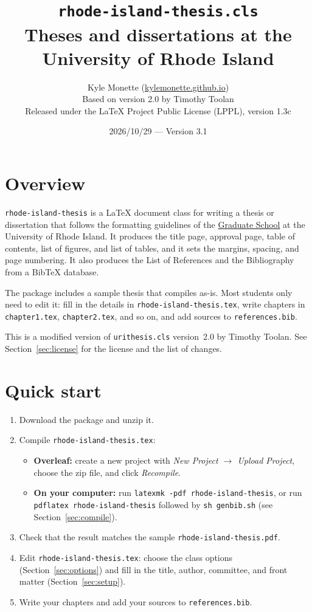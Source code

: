 \documentclass[11pt]{article}
\title{\texttt{rhode-island-thesis.cls}\\[0.5ex]
  \large Theses and dissertations at the University of Rhode Island}
\author{Kyle Monette (\href{https://kylemonette.github.io}{kylemonette.github.io}) \\
  \small Based on version 2.0 by Timothy Toolan \\
  \small Released under the LaTeX Project Public License (LPPL), version 1.3c}
\date{2026/10/29 --- Version 3.1}
\newcommand\cls{\texttt{rhode-island-thesis}}
\newcommand\file[1]{\texttt{#1}}
\begin{document}
\maketitle

\section*{Overview}

\cls{} is a \LaTeX{} document class for writing a thesis or dissertation that
follows the formatting guidelines of the
\href{https://web.uri.edu/graduate-school/academics/thesis-dissertation/formatting/}{Graduate School}
at the University of Rhode Island.
It produces the title page, approval page, table of contents, list of figures,
and list of tables, and it sets the margins, spacing, and page numbering.
It also produces the List of References and the Bibliography from a Bib\TeX{}
database.

The package includes a sample thesis that compiles as-is.
Most students only need to edit it: fill in the details in \file{rhode-island-thesis.tex},
write chapters in \file{chapter1.tex}, \file{chapter2.tex}, and so on, and add
sources to \file{references.bib}.

This is a modified version of \file{urithesis.cls} version~2.0 by Timothy Toolan.
See Section~\ref{sec:license} for the license and the list of changes.

\tableofcontents

\section{Quick start}

\begin{enumerate}
\item Download the package and unzip it.
\item Compile \file{rhode-island-thesis.tex}:
  \begin{itemize}
  \item \textbf{Overleaf:} create a new project with \emph{New Project
    $\to$ Upload Project}, choose the zip file, and click \emph{Recompile}.
  \item \textbf{On your computer:} run \verb|latexmk -pdf rhode-island-thesis|, or run
    \verb|pdflatex rhode-island-thesis| followed by \verb|sh genbib.sh|
    (see Section~\ref{sec:compile}).
  \end{itemize}
\item Check that the result matches the sample \file{rhode-island-thesis.pdf}.
\item Edit \file{rhode-island-thesis.tex}: choose the class options
  (Section~\ref{sec:options}) and fill in the title, author, committee, and
  front matter (Section~\ref{sec:setup}).
\item Write your chapters and add your sources to \file{references.bib}.
\end{enumerate}
\end{document}
